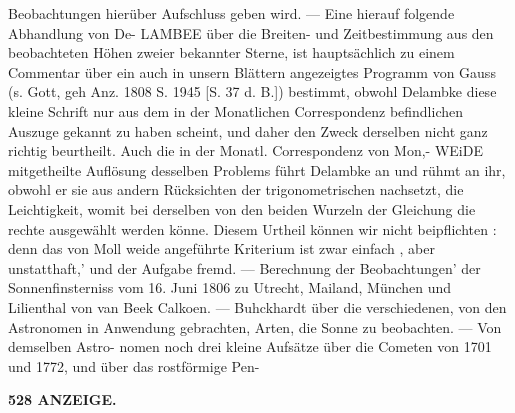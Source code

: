 \documentclass[12pt,a4paper]{article}
\begin{document}
Beobachtungen  hierüber  Aufschluss  geben  wird.  ---  Eine  hierauf  folgende  Abhandlung  von  De- LAMBEE  über  die  Breiten-  und  Zeitbestimmung  aus  den  beobachteten  Höhen  zweier  bekannter  Sterne, ist  hauptsächlich  zu  einem  Commentar  über  ein  auch  in  unsern  Blättern  angezeigtes  Programm  von Gauss  (s.  Gott,  geh  Anz.  1808  S.  1945  [S.  37  d.  B.])  bestimmt,  obwohl  Delambke  diese  kleine  Schrift  nur aus  dem  in  der  Monatlichen  Correspondenz  befindlichen  Auszuge  gekannt  zu  haben  scheint,  und  daher den  Zweck  derselben  nicht  ganz  richtig  beurtheilt.  Auch  die  in  der  Monatl.  Correspondenz  von  Mon,- WEiDE  mitgetheilte  Auflösung  desselben  Problems  führt  Delambke  an  und  rühmt  an  ihr,  obwohl  er  sie aus  andern  Rücksichten  der  trigonometrischen  nachsetzt,  die  Leichtigkeit,  womit  bei  derselben  von  den beiden  Wurzeln  der  Gleichung  die  rechte  ausgewählt  werden  könne.  Diesem  Urtheil  können  wir  nicht beipflichten :  denn  das  von  Moll  weide  angeführte  Kriterium  ist  zwar  einfach ,  aber  unstatthaft,'  und  der Aufgabe  fremd.  ---  Berechnung  der  Beobachtungen'  der  Sonnenfinsterniss  vom  16.  Juni  1806  zu  Utrecht, Mailand,  München  und  Lilienthal  von  van  Beek  Calkoen.  ---  Buhckhardt  über  die  verschiedenen,  von den  Astronomen  in  Anwendung  gebrachten,  Arten,  die  Sonne  zu  beobachten.  ---  Von  demselben  Astro- nomen noch  drei  kleine  Aufsätze  über  die  Cometen  von  1701  und  1772,    und  über  das  rostförmige  Pen-

\vspace{0.5em}


\noindent\textbf{528  ANZEIGE.}
\end{document}
